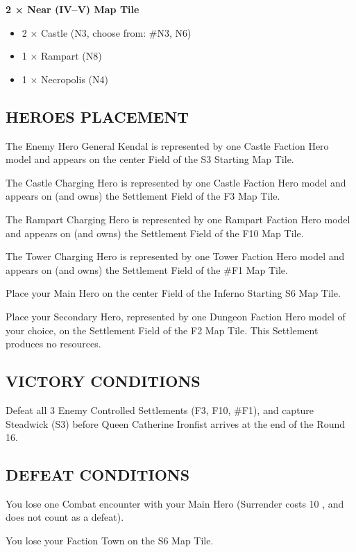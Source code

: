 \begin{multicols*}{2}
\textbf{2 × Near (IV--V) Map Tile}
\begin{itemize}
  \item 2 × Castle (N3, choose from: \#N3, N6)
  \item 1 × Rampart (N8)
  \item 1 × Necropolis (N4)
\end{itemize}

\subsection*{\MakeUppercase{Heroes Placement}}

The Enemy Hero General Kendal is represented by one Castle Faction Hero
model and appears on the center Field of the S3 Starting Map Tile.

The Castle Charging Hero is represented by one Castle Faction Hero model
and appears on (and owns) the Settlement Field of the F3 Map Tile.

The Rampart Charging Hero is represented by one Rampart Faction Hero model
and appears on (and owns) the Settlement Field of the F10 Map Tile.

The Tower Charging Hero is represented by one Tower Faction Hero model
and appears on (and owns) the Settlement Field of the \#F1 Map Tile.

Place your Main Hero on the center Field of the Inferno Starting S6 Map Tile.

Place your Secondary Hero, represented by one Dungeon Faction Hero model of your choice,
on the Settlement Field of the F2 Map Tile. This Settlement produces no resources.

\subsection*{\MakeUppercase{Victory Conditions}}

Defeat all 3 Enemy Controlled Settlements (F3, F10, \#F1), and capture Steadwick (S3) before
Queen Catherine Ironfist arrives at the end of the Round 16.

\subsection*{\MakeUppercase{Defeat Conditions}}

You lose one Combat encounter with your Main Hero (Surrender costs 10 , and does not count as a defeat).

You lose your Faction Town on the S6 Map Tile.


\end{multicols*}
